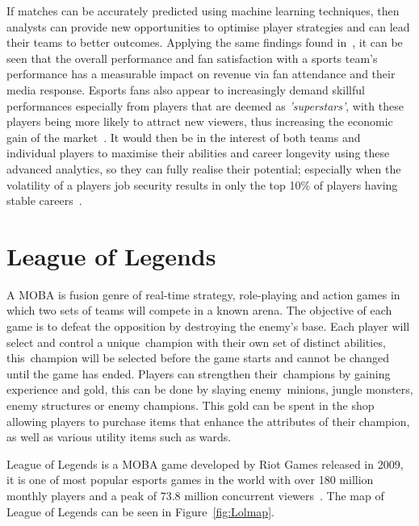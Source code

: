 If matches can be accurately predicted using machine learning techniques, then analysts can provide new opportunities to optimise player strategies and can lead their teams to better outcomes.
Applying the same findings found in~\citet{gray2012customer}, it can be seen that the overall performance and fan satisfaction with a sports team's performance has a measurable impact on revenue via fan attendance and their media response.
Esports fans also appear to increasingly demand skillful performances especially from players that are deemed as \emph{'superstars'}, with these players being more likely to attract new viewers, thus increasing the economic gain of the market~\citep{mangeloja2019economics, ward2019esport}.
It would then be in the interest of both teams and individual players to maximise their abilities and career longevity using these advanced analytics, so they can fully realise their potential;
especially when the volatility of a players job security results in only the top 10\% of players having stable careers~\citep{ward2019esport}.\\


\section{League of Legends}\label{sec:League of Legends}

A \ac{MOBA} is fusion genre of real-time strategy, role-playing and action games in which two sets of teams will compete in a known arena.
The objective of each game is to defeat the opposition by destroying the enemy's base.
Each player will select and control a unique~\gls{champion} with their own set of distinct abilities, this~\gls{champion} will be selected before the game starts and cannot be changed until the game has ended.
Players can strengthen their~\glspl{champion} by gaining experience and gold, this can be done by slaying enemy~\glspl{minion}, \gls{jungle} monsters, enemy structures or enemy \glspl{champion}.
This gold can be spent in the shop allowing players to purchase items that enhance the attributes of their \gls{champion}, as well as various utility items such as \glspl{ward}.

League of Legends is a \ac{MOBA} game developed by Riot Games released in 2009, it is one of most popular esports games in the world with over 180 million monthly players and a peak of 73.8 million concurrent viewers~\citep{riotplayercount, upcomerworld2021}.
The map of League of Legends can be seen in Figure~\ref{fig:Lolmap}.

